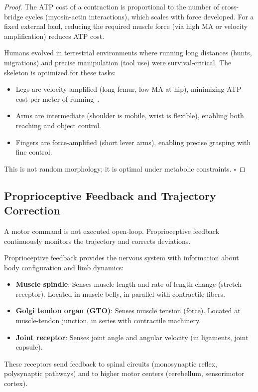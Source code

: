 \begin{proof}
The ATP cost of a contraction is proportional to the number of cross-bridge cycles (myosin-actin interactions), which scales with force developed. For a fixed external load, reducing the required muscle force (via high MA or velocity amplification) reduces ATP cost.

Humans evolved in terrestrial environments where running long distances (hunts, migrations) and precise manipulation (tool use) were survival-critical. The skeleton is optimized for these tasks:
\begin{itemize}[noitemsep]
\item Legs are velocity-amplified (long femur, low MA at hip), minimizing ATP cost per meter of running~\cite{AngillettaMorrison2006}.
\item Arms are intermediate (shoulder is mobile, wrist is flexible), enabling both reaching and object control.
\item Fingers are force-amplified (short lever arms), enabling precise grasping with fine control.
\end{itemize}

This is not random morphology; it is optimal under metabolic constraints. $\square$
\end{proof}

\subsection{Proprioceptive Feedback and Trajectory Correction}
\label{subsec:proprioceptive-feedback}

A motor command is not executed open-loop. Proprioceptive feedback continuously monitors the trajectory and corrects deviations.

\begin{definition}[Proprioception]
\label{def:proprioception}
Proprioceptive feedback provides the nervous system with information about body configuration and limb dynamics:

\begin{itemize}[noitemsep]
\item \textbf{Muscle spindle}: Senses muscle length and rate of length change (stretch receptor). Located in muscle belly, in parallel with contractile fibers.
\item \textbf{Golgi tendon organ (GTO)}: Senses muscle tension (force). Located at muscle-tendon junction, in series with contractile machinery.
\item \textbf{Joint receptor}: Senses joint angle and angular velocity (in ligaments, joint capsule).
\end{itemize}

These receptors send feedback to spinal circuits (monosynaptic reflex, polysynaptic pathways) and to higher motor centers (cerebellum, sensorimotor cortex).
\end{definition}

